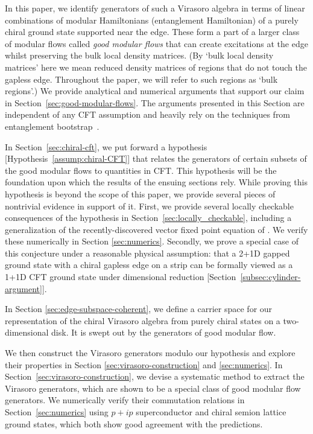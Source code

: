 \documentclass[12pt, nofootinbib]{article}
\theoremstyle{plain}
\theoremstyle{assumption}
\theoremstyle{definition}
\theoremstyle{plain}
\theoremstyle{plain}
\theoremstyle{plain}
\theoremstyle{plain}
\theoremstyle{plain}
\begin{document}
In this paper, we identify generators of such a Virasoro algebra in terms of linear combinations of modular Hamiltonians (entanglement Hamiltonian) of a purely chiral ground state supported near the edge. These form a part of 
a larger class of modular flows called {\it good modular flows} 
that can create excitations at the edge whilst preserving the bulk local density matrices. 
(By `bulk local density matrices' here we mean reduced density matrices of regions that do not touch the gapless edge.  Throughout the paper, we will refer to such regions as `bulk regions'.) 
We provide analytical and numerical arguments that support our claim in Section~\ref{sec:good-modular-flows}. The arguments presented in this Section are independent of any CFT assumption and heavily rely on the techniques from entanglement bootstrap~\cite{shi2020fusion}. 

In Section~\ref{sec:chiral-cft}, we put forward a hypothesis [Hypothesis~\ref{assump:chiral-CFT}] that relates the generators of certain subsets of the good modular flows to quantities in CFT. This hypothesis will be the foundation upon which the results of the ensuing sections rely. While proving this hypothesis is beyond the scope of this paper, we provide several pieces of nontrivial evidence in support of it. First, we provide several locally checkable consequences of the hypothesis in Section~\ref{sec:locally_checkable}, 
including a generalization of 
the recently-discovered vector fixed point equation of \cite{Lin2023}.
We verify these numerically in Section \ref{sec:numerics}.  Secondly, we prove a special case of this conjecture under a reasonable physical assumption: that a 2+1D gapped ground state with a chiral gapless edge on a strip can be formally viewed as a 1+1D CFT ground state under dimensional reduction [Section~\ref{subsec:cylinder-argument}].

In Section \ref{sec:edge-subspace-coherent}, we define a carrier space for our representation of the chiral Virasoro algebra from purely chiral states on a two-dimensional disk.  It is swept out by the generators of good modular flow.  

We then construct the Virasoro generators modulo our hypothesis and explore their properties in Section \ref{sec:virasoro-construction} and \ref{sec:numerics}. 
In Section~\ref{sec:virasoro-construction}, we devise a systematic method to extract the Virasoro generators, which are shown to be a special class of good modular flow generators. We numerically verify their commutation relations in Section~\ref{sec:numerics} using $p+ip$ superconductor and chiral semion lattice ground states, which both show good agreement with the predictions. 
\end{document}

